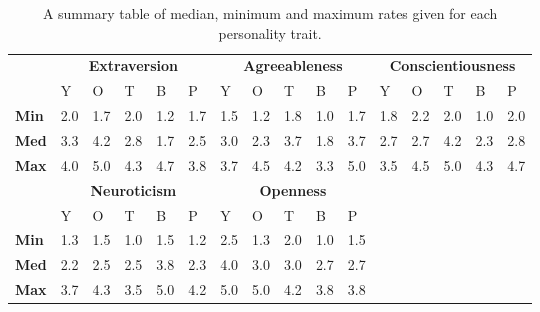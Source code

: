\begin{table}[!htb]
    \renewcommand{\arraystretch}{1}
    \begin{center}
        \begin{tabular}{p{}|
        p{}|p{}|p{}|p{}|p{}||
        p{}|p{}|p{}|p{}|p{}||
        p{}|p{}|p{}|p{}|p{}|}
            \cline{2-16}
            & \multicolumn{5}{c||}{\textbf{Extraversion}} & \multicolumn{5}{c||}{\textbf{Agreeableness}}
            & \multicolumn{5}{c|}{\textbf{Conscientiousness}} \\
            \cline{2-16}
            & Y & O & T & B & P & Y & O & T & B & P & Y & O & T & B & P     \\
            \cline{2-16}
            \textbf{Min}    & 2.0 & 1.7 & 2.0 & 1.2 & 1.7 & 1.5 & 1.2 & 1.8 & 1.0 & 1.7 & 1.8 & 2.2 & 2.0 & 1.0 & 2.0  \\
            \textbf{Med}    & 3.3 & 4.2 & 2.8 & 1.7 & 2.5 & 3.0 & 2.3 & 3.7 & 1.8 & 3.7 & 2.7 & 2.7 & 4.2 & 2.3 & 2.8  \\
            \textbf{Max}    & 4.0 & 5.0 & 4.3 & 4.7 & 3.8 & 3.7 & 4.5 & 4.2 & 3.3 & 5.0 & 3.5 & 4.5 & 5.0 & 4.3 & 4.7 \\
            \cline{2-16}
            \cline{2-11}
            &  \multicolumn{5}{|c||}{\textbf{Neuroticism}} & \multicolumn{5}{|c||}{\textbf{Openness}} \\
            \cline{2-11}
            & Y & O & T & B & P & Y & O & T & B & P            \\
            \cline{2-11}
            \textbf{Min}    & 1.3 & 1.5 & 1.0 & 1.5 & 1.2 & 2.5 & 1.3 & 2.0 & 1.0 & 1.5    \\
            \textbf{Med}    & 2.2 & 2.5 & 2.5 & 3.8 & 2.3 & 4.0 & 3.0 & 3.0 & 2.7 & 2.7    \\
            \textbf{Max}    & 3.7 & 4.3 & 3.5 & 5.0 & 4.2 & 5.0 & 5.0 & 4.2 & 3.8 & 3.8    \\
            \cline{2-11}
        \end{tabular}
        \caption[]{A summary table of median, minimum and maximum rates given for each personality trait.\footnotemark}
        \label{table:medianMT1}
    \end{center}
\end{table}

